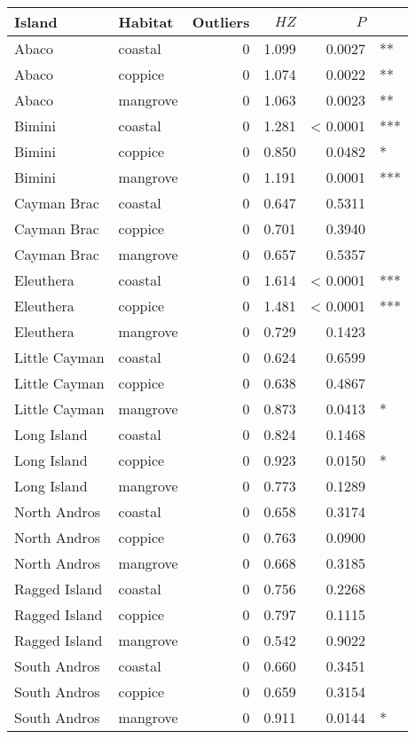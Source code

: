 
\begin{tabular}{llrrrl}
\toprule
Island & Habitat & Outliers & $HZ$ & $P$ & \\
\midrule
Abaco & coastal & 0 & 1.099 & 0.0027 & **\\
Abaco & coppice & 0 & 1.074 & 0.0022 & **\\
Abaco & mangrove & 0 & 1.063 & 0.0023 & **\\
Bimini & coastal & 0 & 1.281 & < 0.0001 & ***\\
Bimini & coppice & 0 & 0.850 & 0.0482 & *\\
Bimini & mangrove & 0 & 1.191 & 0.0001 & ***\\
Cayman Brac & coastal & 0 & 0.647 & 0.5311 & \\
Cayman Brac & coppice & 0 & 0.701 & 0.3940 & \\
Cayman Brac & mangrove & 0 & 0.657 & 0.5357 & \\
Eleuthera & coastal & 0 & 1.614 & < 0.0001 & ***\\
Eleuthera & coppice & 0 & 1.481 & < 0.0001 & ***\\
Eleuthera & mangrove & 0 & 0.729 & 0.1423 & \\
Little Cayman & coastal & 0 & 0.624 & 0.6599 & \\
Little Cayman & coppice & 0 & 0.638 & 0.4867 & \\
Little Cayman & mangrove & 0 & 0.873 & 0.0413 & *\\
Long Island & coastal & 0 & 0.824 & 0.1468 & \\
Long Island & coppice & 0 & 0.923 & 0.0150 & *\\
Long Island & mangrove & 0 & 0.773 & 0.1289 & \\
North Andros & coastal & 0 & 0.658 & 0.3174 & \\
North Andros & coppice & 0 & 0.763 & 0.0900 & \\
North Andros & mangrove & 0 & 0.668 & 0.3185 & \\
Ragged Island & coastal & 0 & 0.756 & 0.2268 & \\
Ragged Island & coppice & 0 & 0.797 & 0.1115 & \\
Ragged Island & mangrove & 0 & 0.542 & 0.9022 & \\
South Andros & coastal & 0 & 0.660 & 0.3451 & \\
South Andros & coppice & 0 & 0.659 & 0.3154 & \\
South Andros & mangrove & 0 & 0.911 & 0.0144 & *\\
\bottomrule
\end{tabular}